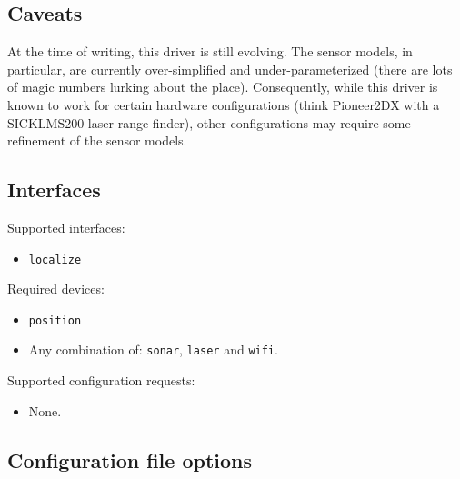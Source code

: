 \subsection*{Caveats} 

At the time of writing, this driver is still evolving.  The sensor
models, in particular, are currently over-simplified and
under-parameterized (there are lots of magic numbers lurking about the
place).  Consequently, while this driver is known to work for certain
hardware configurations (think Pioneer2DX with a SICKLMS200 laser
range-finder), other configurations may require some refinement of the
sensor models.


\subsection*{Interfaces}

\noindent Supported interfaces:
\begin{itemize}
\item {\tt localize}
\end{itemize}

\noindent Required devices:
\begin{itemize}
\item {\tt position}
\item Any combination of: {\tt sonar}, {\tt laser} and {\tt wifi}.
\end{itemize}

\noindent Supported configuration requests:
\begin{itemize}
\item None.
\end{itemize}


\subsection*{Configuration file options}

